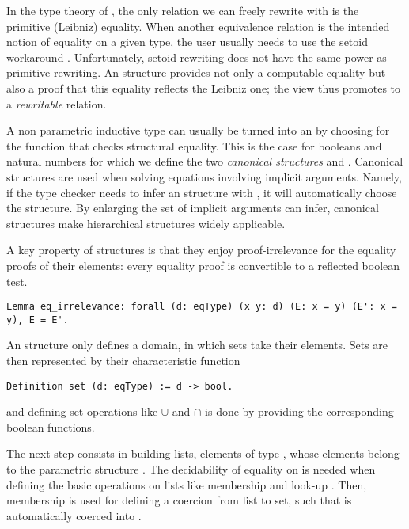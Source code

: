 In the type theory of \Coq{}, the only relation we can freely rewrite with 
is the primitive (Leibniz) equality. When another
equivalence relation is the intended notion of equality on a given
type, the user usually needs to use the setoid
workaround \cite{BarCap}. Unfortunately, setoid rewriting does not have 
the same power as primitive rewriting.
An  structure provides not only a computable
equality \C{==} but also a proof  that this equality reflects the
Leibniz one;
the  view thus promotes \C{==} to a \emph{rewritable} relation.


A non parametric inductive type can usually be turned
into an  by choosing for \C{==} the function that
checks structural equality.
This is the case for booleans and natural numbers for
which we define the two {\it canonical structures}  and .
Canonical structures are used when solving equations involving 
implicit arguments. Namely, if the type
checker needs to infer an  structure with 
, it will automatically choose the 
structure. By enlarging the set of implicit arguments \Coq{} can infer,
canonical structures make hierarchical structures widely applicable.

A key property of  structures is that
they enjoy proof-irrelevance for the
equality proofs of their elements: every equality proof is
convertible to a reflected boolean test.

\begin{lstlisting}
Lemma eq_irrelevance: forall (d: eqType) (x y: d) (E: x = y) (E': x = y), E = E'.
\end{lstlisting}

%
%

An  structure only defines a domain, in which sets take their elements. Sets are 
then represented by their characteristic function 
\begin{lstlisting}
Definition set (d: eqType) := d -> bool.
\end{lstlisting}
and defining set operations like $\cup$ and $\cap$
is done by providing the corresponding boolean functions.

The next step consists in building lists, elements of type , 
whose elements belong to the parametric  structure . The decidability of equality
on  is needed when defining the basic operations on
lists like membership \C{\\in} and look-up . Then, membership
is used for defining a coercion from list to set, such
that  is automatically coerced into .

